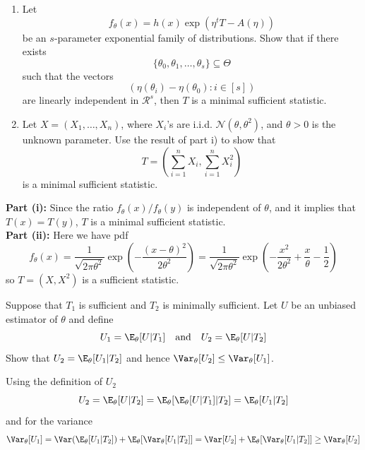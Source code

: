 \documentclass{article}
\begin{document}
\MakeAssignmentTitle

\begin{homeworkProblem}

  \begin{enumerate}[label=\roman*), topsep=5pt, itemsep=5pt]
    \item Let
          \[
            f_\theta(x) = h(x) \exp (\eta^t T - A(\eta))
          \]
          be an $s$-parameter exponential family of distributions. Show that if there exists
          \[
            \{\theta_0, \theta_1, \dots, \theta_s \} \subseteq \Theta
          \]
          such that the vectors
          \[
            (\eta(\theta_i) - \eta(\theta_0) : i \in [s])
          \]
          are linearly independent in $\mathcal{R}^s$, then $T$ is a minimal sufficient statistic.
    \item Let $X = (X_1, \dots, X_n)$, where $X_i$'s are i.i.d. $\mathcal{N}(\theta, \theta^2)$, and $\theta>0$ is the unknown parameter. Use the result of part i) to show that
          \[
            T = \left( \sum_{i=1}^n X_i, \sum_{i=1}^n X_i^2 \right)
          \]
          is a minimal sufficient statistic. \\
  \end{enumerate}

  \solution

  \textbf{Part (i):} Since the ratio $f_\theta(x) / f_{\theta}(y)$ is independent of $\theta$, and it implies that $T(x) = T(y)$, $T$ is a minimal sufficient statistic. \\

  \textbf{Part (ii):} Here we have pdf
  \[
    f_\theta(x) = \frac{1}{\sqrt{2\pi\theta^2}} \exp \left( -\frac{(x-\theta)^2}{2\theta^2} \right) = \frac{1}{\sqrt{2\pi\theta^2}} \exp \left( -\frac{x^2}{2\theta^2} + \frac{x}{\theta} - \frac{1}{2} \right)
  \]
  so $T = (X, X^2)$ is a sufficient statistic.


\end{homeworkProblem}

\pagebreak

\begin{homeworkProblem}

  Suppose that $T_1$ is sufficient and $T_2$ is minimally sufficient. Let $U$ be an unbiased
  estimator of $\theta$ and define
  \[
    U_1 = \E_\theta[U|T_1] \quad \text{and} \quad U_2 = \E_\theta[U|T_2]
  \]
  Show that $U_2 = \E_\theta[U_1|T_2]$ and hence $\Var_\theta[U_2] \leq \Var_\theta[U_1]$. \\

  \solution

  Using the definition of $U_2$
  \[
    U_2 = \E_\theta[U|T_2] = \E_\theta[\E_\theta[U|T_1]|T_2] = \E_\theta[U_1|T_2]
  \]
  and for the variance
  \[
    \Var_\theta[U_1] = \Var(\E_\theta[U_1|T_2]) + \E_\theta[\Var_\theta[U_1|T_2]] = \Var[U_2] + \E_\theta[\Var_\theta[U_1|T_2]] \geq \Var_\theta[U_2]
  \]


\end{homeworkProblem}
\end{document}
